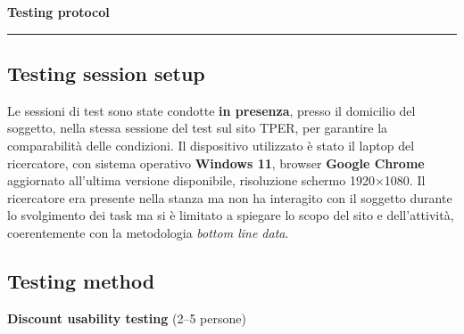 \documentclass[11pt,a4paper]{article}
\begin{document}
\vspace{0.2cm}

\begin{center}
  {\color{secondaryColor}\large\bfseries Testing protocol}
  \vspace{0.1cm}
  \color{borderColor}\hrule
\end{center}

\vspace{0.2cm}

\subsection*{Testing session setup}
\begin{tcolorbox}[colback=backgroundColor,colframe=borderColor,arc=2mm]
Le sessioni di test sono state condotte \textbf{in presenza},
presso il domicilio del soggetto, nella stessa sessione del test sul sito TPER,
per garantire la comparabilità delle condizioni.
Il dispositivo utilizzato è stato il laptop del ricercatore,
con sistema operativo \textbf{Windows 11}, browser
\textbf{Google Chrome} aggiornato all'ultima versione
disponibile, risoluzione schermo 1920×1080. Il ricercatore
era presente nella stanza ma non ha interagito con il
soggetto durante lo svolgimento dei task  ma si è limitato a spiegare lo scopo del sito e dell'attività, coerentemente
con la metodologia \textit{bottom line data}.
\end{tcolorbox}

\vspace{0.2cm}

\subsection*{Testing method}
\textbf{Discount usability testing}
(2--5 persone)

\vspace{0.4cm}
\end{document}
